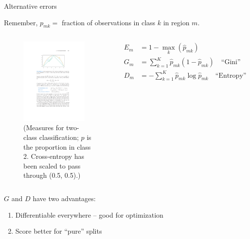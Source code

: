 \documentclass[mathserif, aspectratio=169]{beamer}
\begin{document}
\begin{frame}{Alternative errors}

Remember, $p_{mk} =$  fraction of observations in class $k$ in region $m$.

\begin{columns}
\begin{figure}
\includegraphics[width=0.9\textwidth]{E_vs_G_vs_D}
\vspace*{-3mm}
\caption*{\scriptsize (Measures for two-class classification; $p$ is the proportion in class 2. Cross-entropy has been scaled to pass through (0.5, 0.5).)}
\end{figure}
\begin{align*}
E_m &= 1- \max_k (\hat{p}_{mk})\\
G_m &= \sum_{k=1}^K \hat{p}_{mk}(1-\hat{p}_{mk})\quad\text{``Gini''}\\
D_m &= -\sum_{k=1}^K \hat{p}_{mk}\log{ \hat{p}_{mk}}\quad\text{``Entropy''}
\end{align*}
\end{columns}
\vspace{5mm}
$G$ and $D$ have two advantages:
\begin{enumerate}
\item Differentiable everywhere -- good for optimization
\item Score better for ``pure'' splits
\end{enumerate}
\end{frame}
\end{document}
